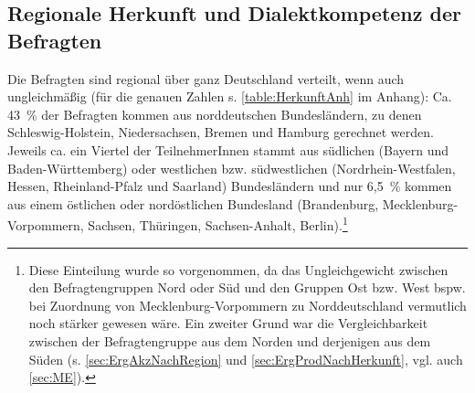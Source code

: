 \subsection{Regionale Herkunft und Dialektkompetenz der Befragten}
\label{sec:HerkunftundDialekt}
Die Befragten sind regional über ganz Deutschland verteilt, wenn auch ungleichmäßig (für die genauen Zahlen s. \autoref{table:HerkunftAnh} im Anhang): 
Ca. 43~\% der Befragten kommen aus norddeutschen Bundesländern, zu denen Schleswig-Holstein, Niedersachsen, Bremen und Hamburg gerechnet werden. 
Jeweils ca. ein Viertel der TeilnehmerInnen stammt aus südlichen (Bayern und Baden-Württemberg) oder westlichen bzw. südwestlichen (Nordrhein-Westfalen, Hessen, Rheinland-Pfalz und Saarland) Bundesländern und nur 6,5~\% kommen aus einem östlichen oder nordöstlichen Bundesland (Brandenburg, Mecklenburg-Vorpommern, Sachsen, Thüringen, Sachsen-Anhalt, Berlin).\footnote{Diese Einteilung wurde so vorgenommen, da das Ungleichgewicht zwischen den Befragtengruppen Nord oder Süd und den Gruppen Ost bzw. West bspw. bei Zuordnung von Mecklenburg-Vorpommern zu Norddeutschland vermutlich noch stärker gewesen wäre.
Ein zweiter Grund war die Vergleichbarkeit zwischen der Befragtengruppe aus dem Norden und derjenigen aus dem Süden (s. \autoref{sec:ErgAkzNachRegion} und \autoref{sec:ErgProdNachHerkunft}, vgl. auch \autoref{sec:ME}).}

